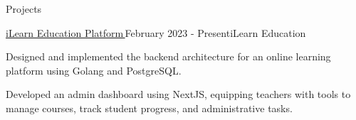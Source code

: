 \documentclass[
	10pt, %
]{resume} %
\let\orighref\href
\renewcommand{\href}[2]{\orighref{#1}{#2\,\faExternalLink}}
\begin{document}

\begin{rSection}{Projects}





	\begin{rSubsection}{\href{https://ilearneducation.com.au/}{iLearn Education Platform}}{February 2023 - Present}{iLearn Education}{}
		\item Designed and implemented the backend architecture for an online learning platform using Golang and PostgreSQL.
		\item Developed an admin dashboard using NextJS, equipping teachers with tools to manage courses, track student progress, and administrative tasks.
	\end{rSubsection}


\end{rSection}
\end{document}
